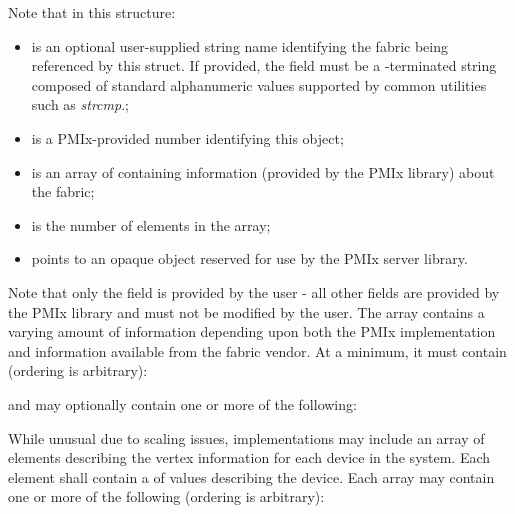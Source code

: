Note that in this structure:

\begin{itemize}
    \item {} is an optional user-supplied string name identifying the fabric being referenced by this struct. If provided, the field must be a -terminated string composed of standard alphanumeric values supported by common utilities such as \textit{strcmp}.;
    \item {} is a \ac{PMIx}-provided number identifying this object;
    \item {} is an array of  containing information (provided by the \ac{PMIx} library) about the fabric;
    \item {} is the number of elements in the  array;
    \item {} points to an opaque object reserved for use by the \ac{PMIx} server library.
\end{itemize}

Note that only the  field is provided by the user - all other fields are provided by the \ac{PMIx} library and must not be modified by the user. The  array contains a varying amount of information depending upon both the \ac{PMIx} implementation and information available from the fabric vendor. At a minimum, it must contain (ordering is arbitrary):

\reqattrstart


\reqattrend

and may optionally contain one or more of the following:

\optattrstart
{}

While unusual due to scaling issues, implementations may include an array of  elements describing the vertex information for each device in the system. Each element shall contain a  of  values describing the device. Each array may contain one or more of the following (ordering is arbitrary):

